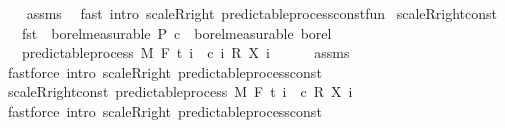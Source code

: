 \begin{isabellebody}
%
\isadelimproof
\ \ %
\endisadelimproof
%
\isatagproof
{}\isamarkupfalse%
\ assms\ \isamarkupfalse%
\ {\isacharparenleft}{\kern0pt}fast\ intro{\isacharcolon}{\kern0pt}\ scaleR{\isacharunderscore}{\kern0pt}right\ predictable{\isacharunderscore}{\kern0pt}process{\isacharunderscore}{\kern0pt}const{\isacharunderscore}{\kern0pt}fun{\isacharparenright}{\kern0pt}%
\endisatagproof
{\isafoldproof}%
%
\isadelimproof
\isanewline
%
\endisadelimproof
\isanewline
{}\isamarkupfalse%
\ scaleR{\isacharunderscore}{\kern0pt}right{\isacharunderscore}{\kern0pt}const{\isacharcolon}{\kern0pt}\ \isanewline
\ \ \ {\isachardoublequoteopen}fst\ {\isasymin}\ borel{\isacharunderscore}{\kern0pt}measurable\ {\isasymSigma}\isactrlsub P{\isachardoublequoteclose}\ {\isachardoublequoteopen}c\ {\isasymin}\ borel{\isacharunderscore}{\kern0pt}measurable\ borel{\isachardoublequoteclose}\isanewline
\ \ \ {\isachardoublequoteopen}predictable{\isacharunderscore}{\kern0pt}process\ M\ F\ t\ {\isacharparenleft}{\kern0pt}{\isasymlambda}i\ {\isasymxi}{\isachardot}{\kern0pt}\ c\ i\ {\isacharasterisk}{\kern0pt}\isactrlsub R\ {\isacharparenleft}{\kern0pt}X\ i\ {\isasymxi}{\isacharparenright}{\kern0pt}{\isacharparenright}{\kern0pt}{\isachardoublequoteclose}\ \isanewline
%
\isadelimproof
\ \ %
\endisadelimproof
%
\isatagproof
{}\isamarkupfalse%
\ assms\ \isamarkupfalse%
\ {\isacharparenleft}{\kern0pt}fastforce\ intro{\isacharcolon}{\kern0pt}\ scaleR{\isacharunderscore}{\kern0pt}right\ predictable{\isacharunderscore}{\kern0pt}process{\isacharunderscore}{\kern0pt}const{\isacharparenright}{\kern0pt}%
\endisatagproof
{\isafoldproof}%
%
\isadelimproof
\isanewline
%
\endisadelimproof
\isanewline
{}\isamarkupfalse%
\ scaleR{\isacharunderscore}{\kern0pt}right{\isacharunderscore}{\kern0pt}const{\isacharprime}{\kern0pt}{\isacharcolon}{\kern0pt}\ {\isachardoublequoteopen}predictable{\isacharunderscore}{\kern0pt}process\ M\ F\ t\ {\isacharparenleft}{\kern0pt}{\isasymlambda}i\ {\isasymxi}{\isachardot}{\kern0pt}\ c\ {\isacharasterisk}{\kern0pt}\isactrlsub R\ {\isacharparenleft}{\kern0pt}X\ i\ {\isasymxi}{\isacharparenright}{\kern0pt}{\isacharparenright}{\kern0pt}{\isachardoublequoteclose}\ \isanewline
%
\isadelimproof
\ \ %
\endisadelimproof
%
\isatagproof
{}\isamarkupfalse%
\ {\isacharparenleft}{\kern0pt}fastforce\ intro{\isacharcolon}{\kern0pt}\ scaleR{\isacharunderscore}{\kern0pt}right\ predictable{\isacharunderscore}{\kern0pt}process{\isacharunderscore}{\kern0pt}const{\isacharprime}{\kern0pt}{\isacharparenright}{\kern0pt}%

\end{isabellebody}
